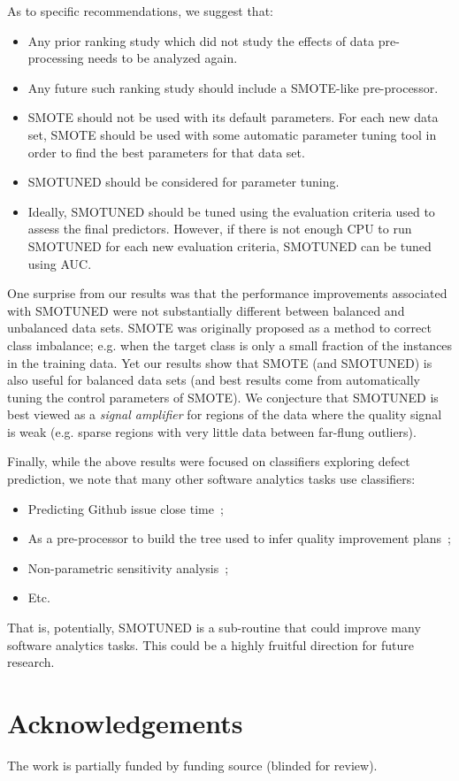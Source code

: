 \documentclass[10pt,conference]{IEEEtran}
\newcommand{\bi}{\begin{itemize}[leftmargin=0.4cm]}
\newcommand{\ei}{\end{itemize}}
\theoremstyle{break}
\theoremstyle{break}
\newcommand{\sma}{{\sc SMOTE}}
\newcommand{\smb}{{\sc SMOTUNED}}
\begin{document}
\noindent
As to specific recommendations,
we suggest that:
\bi
 \item Any prior ranking study  which did not  study the effects of data pre-processing needs to be analyzed again.
 \item Any future such ranking study should include a {\sma}-like
 pre-processor.
 \item {\sma} should not be used with its default parameters.
 For each new data set,
{\sma} should be used with some automatic parameter tuning tool in
order to find the best parameters for that data set.
\item {\smb} should be considered for parameter tuning.
\item Ideally, {\smb} should be tuned using the evaluation criteria used to assess the final predictors.
However, if there is not enough CPU to run {\smb} for each new evaluation criteria, {\smb} can be tuned using AUC.
\ei
One surprise from our results was that the performance improvements associated with {\smb} were not substantially different between balanced and unbalanced data sets.
 {\sma} was originally proposed as a method to correct class imbalance; e.g. when the target class is only a small fraction of the instances in the training data.
 Yet our results show that {\sma} (and {\smb}) is also useful for balanced data sets (and best results come from automatically tuning the control parameters of {\sma}). We conjecture that {\smb}
is best viewed as a   {\em signal amplifier} for regions of the data where the quality signal is weak  (e.g. sparse regions with very little data between far-flung outliers).


 


Finally, while the above results were focused on classifiers exploring defect prediction, we note that many other software analytics
tasks use classifiers:
\bi
\item Predicting Github issue close time~\cite{jones17};
\item As a pre-processor to build the tree used to 
infer quality improvement plans~\cite{krishna2017less};
\item Non-parametric sensitivity analysis~\cite{menzies2000practical};
\item Etc.
\ei
That is, potentially, {\smb} is  a sub-routine that could improve many software analytics tasks. This could be a highly fruitful direction for future research.

\section*{Acknowledgements}
The work is partially funded by
funding source (blinded for review).

\balance



%
\medskip
 
\end{document}
